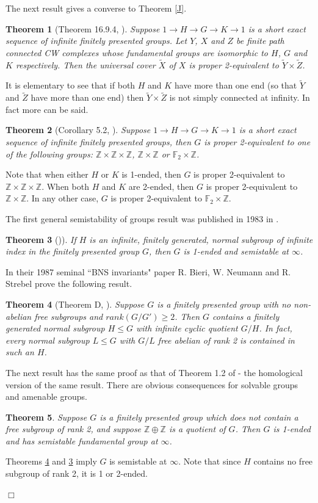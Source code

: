 \documentclass[12pt]{article}
\newtheorem{theorem}{Theorem}[subsection]
\newenvironment{proof}{\addvspace{12pt}\noindent{\bf Proof:}}{
$\Box$\par\addvspace{12pt}}
\begin{document}
The next result gives a converse to Theorem \ref{J}.
\begin{theorem} [Theorem 16.9.4, \cite{G}] \label{JConv}  
Suppose $1\to H\to G\to K\to 1$ is a short exact sequence of infinite finitely presented groups. Let $Y$, $X$ and $Z$ be finite path connected CW complexes whose fundamental groups are isomorphic to $H$, $G$ and $K$ respectively. Then the universal cover $\tilde X$ of $X$ is proper 2-equivalent to $\tilde Y\times \tilde Z$. 
\end{theorem}
It is elementary to see that if both $H$ and $K$ have more than one end (so that $\tilde Y$ and $\tilde Z$ have more than one end) then $\tilde Y\times \tilde Z$ is not simply connected at infinity. In fact more can be said. 

\begin{theorem} [Corollary 5.2, \cite{CLQR20}] \label{P2E}  Suppose $1\to H\to G\to K\to 1$ is a short exact sequence of infinite finitely presented groups, then $G$ is proper 2-equivalent to one of the following groups: $\mathbb Z\times \mathbb Z\times\mathbb Z$, $\mathbb Z\times \mathbb Z$ or $\mathbb F_2\times \mathbb Z$. 
\end{theorem} 
Note that when either $H$ or $K$ is 1-ended, then $G$ is proper 2-equivalent to $\mathbb Z\times \mathbb Z\times\mathbb Z$. When both $H$ and $K$ are 2-ended, then $G$ is proper 2-equivalent to $\mathbb Z\times \mathbb Z$.  In any other case, $G$ is proper 2-equivalent to $\mathbb F_2\times \mathbb Z$.

The first general semistability of groups result was published in 1983 in \cite{M1}. 
\begin{theorem} [\cite{M1})] \label{M1}  
If $H$ is an infinite, finitely generated, normal subgroup of infinite index in the finitely presented group $G$, then $G$ is 1-ended and semistable at $\infty$. 
\end{theorem}
In their 1987 seminal ``BNS invariants" paper R. Bieri, W. Neumann and R. Strebel prove the following result. 
\begin{theorem} [Theorem D, \cite{BNS87}] \label{BNS} 
Suppose $G$ is a finitely presented group with no non-abelian free subgroups and $rank (G/G')\geq 2$. Then $G$ contains a finitely generated normal subgroup $H \leq G$ with infinite cyclic quotient $G/H$. In fact, every normal
subgroup $L \leq  G$ with $G/L$ free abelian of rank 2 is contained in such an $H$.
\end{theorem}
The next result has the same proof as that of Theorem 1.2 of \cite{GM85} - the homological version of the same result. There are obvious consequences for solvable groups and amenable groups. 
\begin{theorem}\label{NOF2} 
Suppose $G$ is a finitely presented group which does not contain a free subgroup of rank 2, and suppose $\mathbb Z\oplus \mathbb Z$ is a quotient of $G$. Then $G$ is 1-ended and has semistable fundamental group at $\infty$. 
\end{theorem}
\begin{proof} 
Theorems \ref{BNS} and \ref{M1} imply $G$ is semistable at $\infty$. Note that since $H$ contains no free subgroup of rank 2, it is 1 or 2-ended.
\end{proof} 
 
\end{document}
